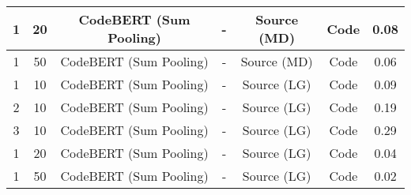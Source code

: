 \begin{longtable}{|c|c|c|c|c|c|c|}
\hline
1 & 20 & CodeBERT (Sum Pooling) & - & Source (MD) & Code & 0.08 \\
\hline
1 & 50 & CodeBERT (Sum Pooling) & - & Source (MD) & Code & 0.06 \\
\hline
1 & 10 & CodeBERT (Sum Pooling) & - & Source (LG) & Code & 0.09 \\
\hline
2 & 10 & CodeBERT (Sum Pooling) & - & Source (LG) & Code & 0.19 \\
\hline
3 & 10 & CodeBERT (Sum Pooling) & - & Source (LG) & Code & 0.29 \\
\hline
1 & 20 & CodeBERT (Sum Pooling) & - & Source (LG) & Code & 0.04 \\
\hline
1 & 50 & CodeBERT (Sum Pooling) & - & Source (LG) & Code & 0.02 \\
\hline
\end{longtable}
